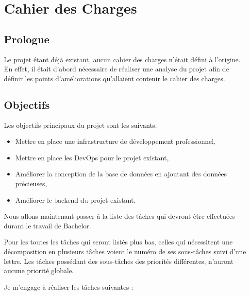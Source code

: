 \documentclass[
    iai, %
    il, %
]{heig-tb}
\begin{document}
\section{Cahier des Charges}

\subsection{Prologue}

Le projet étant déjà existant, aucun cahier des charges n'était défini à
l'origine. En effet, il était d'abord nécessaire de réaliser une analyse
du projet afin de définir les points d'améliorations qu'allaient
contenir le cahier des charges.

\subsection{Objectifs}

Les objectifs principaux du projet sont les suivants:
\begin{itemize}
    \item Mettre en place une infrastructure de développement professionnel,
    \item Mettre en place les DevOps pour le projet existant,
    \item Améliorer la conception de la base de données en ajoutant des données précieuses,
    \item Améliorer le backend du projet existant.
\end{itemize}

\newpage
Nous allons maintenant passer à la liste des tâches qui devront être
effectuées durant le travail de Bachelor.

Pour les toutes les tâches qui seront listés plus bas, celles qui nécessitent une décomposition en plusieurs tâches voient le numéro de ses sous-tâches suivi d'une lettre. Les tâches possédant des sous-tâches des priorités différentes, n'auront aucune priorité globale.

Je m'engage à réaliser les tâches suivantes :
\end{document}
